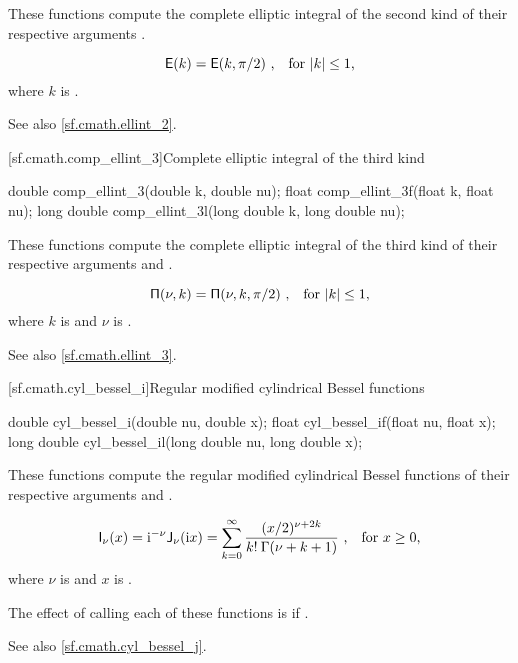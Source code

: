 \begin{itemdescr}
\pnum
\effects
These functions compute
the complete elliptic integral of the second kind
of their respective arguments
.

\pnum
\returns
\[ \mathsf{E}(k) = \mathsf{E}(k, \pi / 2) \text{ ,\quad for $|k| \le 1$,} \]
where
$k$ is .

\pnum
See also \ref{sf.cmath.ellint_2}.
\end{itemdescr}

[sf.cmath.comp_ellint_3]{Complete elliptic integral of the third kind}%
%
%
%
%
%
\begin{itemdecl}
double       comp_ellint_3(double k, double nu);
float        comp_ellint_3f(float k, float nu);
long double  comp_ellint_3l(long double k, long double nu);
\end{itemdecl}

\begin{itemdescr}
\pnum
\effects
These functions compute
the complete elliptic integral of the third kind
of their respective arguments
 and .

\pnum
\returns
\[ \mathsf{\Pi}(\nu, k) = \mathsf{\Pi}(\nu, k, \pi / 2) \text{ ,\quad for $|k| \le 1$,} \]
where
$k$ is  and
$\nu$ is .

\pnum
See also \ref{sf.cmath.ellint_3}.
\end{itemdescr}

[sf.cmath.cyl_bessel_i]{Regular modified cylindrical Bessel functions}%
%
%
%
%
%
\begin{itemdecl}
double       cyl_bessel_i(double nu, double x);
float        cyl_bessel_if(float nu, float x);
long double  cyl_bessel_il(long double nu, long double x);
\end{itemdecl}

\begin{itemdescr}
\pnum
\effects
These functions compute
the regular modified cylindrical Bessel functions
of their respective arguments
 and .

\pnum
\returns
\[ \mathsf{I}_\nu(x) =
     \mathrm{i}^{-\nu} \mathsf{J}_\nu(\mathrm{i}x) =
     \sum_{k=0}^\infty \frac{(x/2)^{\nu+2k}}{k! \: \Gamma(\nu+k+1)}
     \text{ ,\quad for $x \ge 0$,} \]
where
$\nu$ is  and
$x$ is .

\pnum
\remarks
The effect of calling each of these functions
is 
if .

\pnum
See also \ref{sf.cmath.cyl_bessel_j}.
\end{itemdescr}

